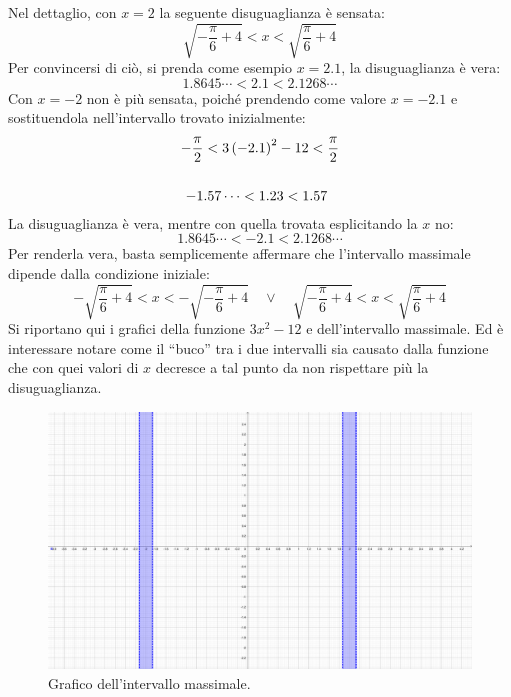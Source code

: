 \documentclass[a4paper]{article}
\newcommand{\dquotes}[1]{``#1''}
\begin{document}
	\noindent
	Nel dettaglio, con $x = 2$ la seguente disuguaglianza è sensata:
	\begin{equation*}
		\sqrt{- \dfrac{\pi}{6} + 4} < x < \sqrt{\dfrac{\pi}{6} + 4}
	\end{equation*}
	Per convincersi di ciò, si prenda come esempio $x = 2.1$, la disuguaglianza è vera:
	\begin{equation*}
		1.8645\cdots < 2.1 < 2.1268\cdots
	\end{equation*}
	Con $x = -2$ non è più sensata, poiché prendendo come valore $x = -2.1$ e sostituendola nell'intervallo trovato inizialmente:
	\begin{gather*}
		-\dfrac{\pi}{2} < 3\left(-2.1\right)^{2} - 12 < \dfrac{\pi}{2} \\ \\
		-1.57\cdots < 1.23 < 1.57 \hspace{.5em}
	\end{gather*}
	La disuguaglianza è vera, mentre con quella trovata esplicitando la $x$ no:
	\begin{equation*}
		1.8645\cdots < -2.1 < 2.1268\cdots
	\end{equation*}
	Per renderla vera, basta semplicemente affermare che l'intervallo massimale dipende dalla condizione iniziale:
	\begin{equation*}
		-\sqrt{\dfrac{\pi}{6} + 4} < x < -\sqrt{- \dfrac{\pi}{6} + 4} \hspace{1em} \lor \hspace{1em}
		\sqrt{- \dfrac{\pi}{6} + 4} < x < \sqrt{\dfrac{\pi}{6} + 4}
	\end{equation*}
	Si riportano qui i grafici della funzione $3x^{2} - 12$ e dell'intervallo massimale. Ed è interessare notare come il \dquotes{buco} tra i due intervalli sia causato dalla funzione che con quei valori di $x$ decresce a tal punto da non rispettare più la disuguaglianza.
	\begin{figure}[!htp]
		\centering
		\includegraphics[width=\textwidth]{img/exercise/2023-06-21-A-ex1_2.pdf}
		\caption{Grafico dell'intervallo massimale.}
	\end{figure}
\end{document}
